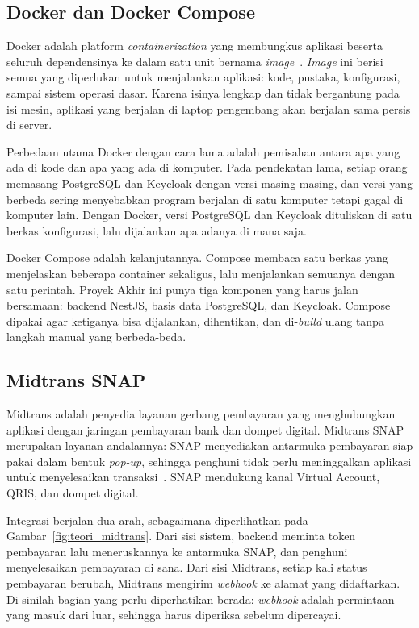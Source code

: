 \subsection{Docker dan Docker Compose}

Docker adalah platform \textit{containerization} yang membungkus aplikasi beserta seluruh dependensinya ke dalam satu unit bernama \textit{image}~\cite{merkel2014}. \textit{Image} ini berisi semua yang diperlukan untuk menjalankan aplikasi: kode, pustaka, konfigurasi, sampai sistem operasi dasar. Karena isinya lengkap dan tidak bergantung pada isi mesin, aplikasi yang berjalan di laptop pengembang akan berjalan sama persis di server.

Perbedaan utama Docker dengan cara lama adalah pemisahan antara apa yang ada di kode dan apa yang ada di komputer. Pada pendekatan lama, setiap orang memasang PostgreSQL dan Keycloak dengan versi masing-masing, dan versi yang berbeda sering menyebabkan program berjalan di satu komputer tetapi gagal di komputer lain. Dengan Docker, versi PostgreSQL dan Keycloak dituliskan di satu berkas konfigurasi, lalu dijalankan apa adanya di mana saja.

Docker Compose adalah kelanjutannya. Compose membaca satu berkas yang menjelaskan beberapa container sekaligus, lalu menjalankan semuanya dengan satu perintah. Proyek Akhir ini punya tiga komponen yang harus jalan bersamaan: backend NestJS, basis data PostgreSQL, dan Keycloak. Compose dipakai agar ketiganya bisa dijalankan, dihentikan, dan di-\textit{build} ulang tanpa langkah manual yang berbeda-beda.

\subsection{Midtrans SNAP}

Midtrans adalah penyedia layanan gerbang pembayaran yang menghubungkan aplikasi dengan jaringan pembayaran bank dan dompet digital. Midtrans SNAP merupakan layanan andalannya: SNAP menyediakan antarmuka pembayaran siap pakai dalam bentuk \textit{pop-up}, sehingga penghuni tidak perlu meninggalkan aplikasi untuk menyelesaikan transaksi~\cite{midtrans2025}. SNAP mendukung kanal Virtual Account, QRIS, dan dompet digital.

Integrasi berjalan dua arah, sebagaimana diperlihatkan pada Gambar~\ref{fig:teori_midtrans}. Dari sisi sistem, backend meminta token pembayaran lalu meneruskannya ke antarmuka SNAP, dan penghuni menyelesaikan pembayaran di sana. Dari sisi Midtrans, setiap kali status pembayaran berubah, Midtrans mengirim \textit{webhook} ke alamat yang didaftarkan. Di sinilah bagian yang perlu diperhatikan berada: \textit{webhook} adalah permintaan yang masuk dari luar, sehingga harus diperiksa sebelum dipercayai.

